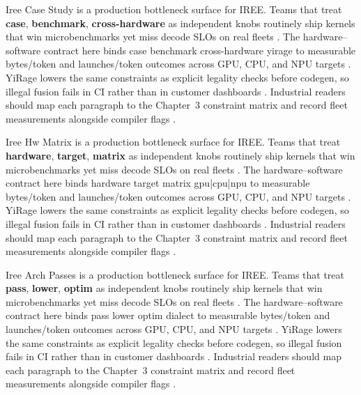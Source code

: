 Iree Case Study is a production bottleneck surface for IREE. Teams that treat \textbf{case}, \textbf{benchmark}, \textbf{cross-hardware} as independent knobs routinely ship kernels that win microbenchmarks yet miss decode SLOs on real fleets \citep{semianalysis2024tma,dlbook}. The hardware--software contract here binds case benchmark cross-hardware yirage to measurable bytes/token and launches/token outcomes across GPU, CPU, and NPU targets \citep{amd2024xdna,dao2022flashattention}. YiRage lowers the same constraints as explicit legality checks before codegen, so illegal fusion fails in CI rather than in customer dashboards \citep{amd2024aie,kwon2023vllm}. Industrial readers should map each paragraph to the Chapter~3 constraint matrix and record fleet measurements alongside compiler flags \citep{dlbook,nvidia2024cudagraphs}.

Iree Hw Matrix is a production bottleneck surface for IREE. Teams that treat \textbf{hardware}, \textbf{target}, \textbf{matrix} as independent knobs routinely ship kernels that win microbenchmarks yet miss decode SLOs on real fleets \citep{amd2024xdna,dao2022flashattention}. The hardware--software contract here binds hardware target matrix gpu|cpu|npu to measurable bytes/token and launches/token outcomes across GPU, CPU, and NPU targets \citep{amd2024aie,kwon2023vllm}. YiRage lowers the same constraints as explicit legality checks before codegen, so illegal fusion fails in CI rather than in customer dashboards \citep{dlbook,nvidia2024cudagraphs}. Industrial readers should map each paragraph to the Chapter~3 constraint matrix and record fleet measurements alongside compiler flags \citep{dao2022flashattention,liu2024deepseekv3}.

Iree Arch Passes is a production bottleneck surface for IREE. Teams that treat \textbf{pass}, \textbf{lower}, \textbf{optim} as independent knobs routinely ship kernels that win microbenchmarks yet miss decode SLOs on real fleets \citep{amd2024aie,kwon2023vllm}. The hardware--software contract here binds pass lower optim dialect to measurable bytes/token and launches/token outcomes across GPU, CPU, and NPU targets \citep{dlbook,nvidia2024cudagraphs}. YiRage lowers the same constraints as explicit legality checks before codegen, so illegal fusion fails in CI rather than in customer dashboards \citep{dao2022flashattention,liu2024deepseekv3}. Industrial readers should map each paragraph to the Chapter~3 constraint matrix and record fleet measurements alongside compiler flags \citep{kwon2023vllm,patel2025llminference}.

